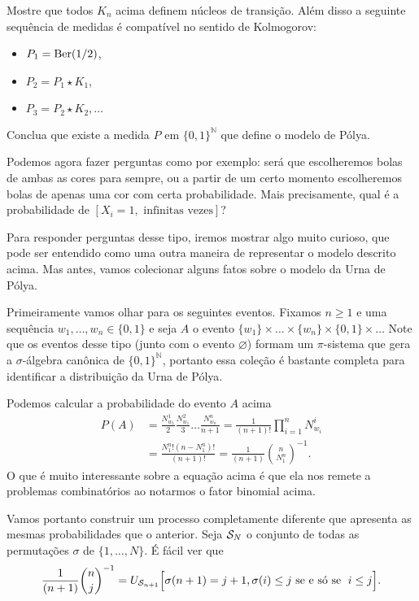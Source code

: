 \begin{topics}
\begin{exercise}
  \label{x:constr_Polya}
  Mostre que todos $K_n$ acima definem núcleos de transição.
  Além disso a seguinte sequência de medidas é compatível no sentido de Kolmogorov:
  \begin{itemize}
  \item $P_1 = \operatorname{Ber}(1/2)$,
  \item $P_2 = P_1 \star K_1$,
  \item $P_3 = P_2 \star K_2, \dots$
  \end{itemize}
  Conclua que existe a medida $P$ em $\{0,1\}^\mathbb{N}$ que define o modelo de Pólya.
\end{exercise}

Podemos agora fazer perguntas como por exemplo: será que escolheremos bolas de ambas as cores para sempre, ou a partir de um certo momento escolheremos bolas de apenas uma cor com certa probabilidade.
Mais precisamente, qual é a probabilidade de $[X_i = 1, \text{ infinitas vezes}]$?


Para responder perguntas desse tipo, iremos mostrar algo muito curioso, que pode ser entendido como uma outra maneira de representar o modelo descrito acima.
Mas antes, vamos colecionar alguns fatos sobre o modelo da Urna de Pólya.

Primeiramente vamos olhar para os seguintes eventos.
Fixamos $n \geq 1$ e uma sequência $w_1, \dots, w_n \in \{0,1\}$ e seja $A$ o evento $\{w_1\} \times \dots \times \{w_n\} \times \{0,1\} \times \dots$
Note que os eventos desse tipo (junto com o evento $\varnothing$) formam um $\pi$-sistema que gera a $\sigma$-álgebra canônica de $\{0,1\}^\mathbb{N}$, portanto essa coleção é bastante completa para identificar a distribuição da Urna de Pólya.

Podemos calcular a probabilidade do evento $A$ acima
\begin{equation}
  \begin{split}
    P(A) & = \frac{N^1_{w_1}}2 \frac{N^2_{w_1}}3 \dots \frac{N^n_{w_n}}{n+1} = \frac{1}{(n+1)!} \prod_{i=1}^n N^i_{w_i}\\
    & = \frac{N^n_1! (n - N^n_1)!}{(n+1)!} = \frac{1}{(n+1)} \binom{n}{N^n_1}^{-1}.
  \end{split}
\end{equation}
O que é muito interessante sobre a equação acima é que ela nos remete a problemas combinatórios ao notarmos o fator binomial acima.

Vamos portanto construir um processo completamente diferente que apresenta as mesmas probabilidades que o anterior.
Seja ${\mathcal S}_N$ o conjunto de todas as permutações $\sigma$ de $\{1,\dots,N\}$.
É fácil ver que
\begin{equation*}
  \frac{1}{(n+1)} \binom{n}{j}^{-1} = U_{{\mathcal S}_{n+1}} \Big[ \sigma(n+1) =j+1, \sigma(i) \leq j \text{ se e só se } \; i \leq j \Big].
\end{equation*}


\end{topics}

